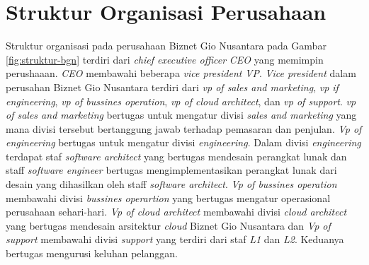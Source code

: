 \section{Struktur Organisasi Perusahaan}

Struktur organisasi pada perusahaan Biznet Gio Nusantara pada Gambar
\ref{fig:struktur-bgn} terdiri dari \emph{chief executive officer}
\emph{CEO} yang memimpin perushaaan. \emph{CEO} membawahi beberapa
\emph{vice president} \emph{VP}. \emph{Vice president} dalam perusahan
Biznet Gio Nusantara terdiri dari \emph{vp of sales and marketing},
\emph{vp if engineering}, \emph{vp of bussines operation}, \emph{vp of
  cloud architect}, dan \emph{vp of support}. \emph{vp of sales and
  marketing} bertugas untuk mengatur divisi \emph{sales and marketing}
yang mana divisi tersebut bertanggung jawab terhadap pemasaran dan
penjulan. \emph{Vp of engineering} bertugas untuk mengatur divisi
\emph{engineering}. Dalam divisi \emph{engineering} terdapat staf
\emph{software architect} yang bertugas mendesain perangkat lunak dan
staff \emph{software engineer} bertugas mengimplementasikan perangkat
lunak dari desain yang dihasilkan oleh staff \emph{software
  architect}. \emph{Vp of bussines operation} membawahi divisi
\emph{bussines operartion} yang bertugas mengatur operasional
perusahaan sehari-hari. \emph{Vp of cloud architect} membawahi divisi
\emph{cloud architect} yang bertugas mendesain arsitektur \emph{cloud}
Biznet Gio Nusantara dan \emph{Vp of support} membawahi divisi
\emph{support} yang terdiri dari staf \emph{L1} dan
\emph{L2}. Keduanya bertugas mengurusi keluhan pelanggan.

